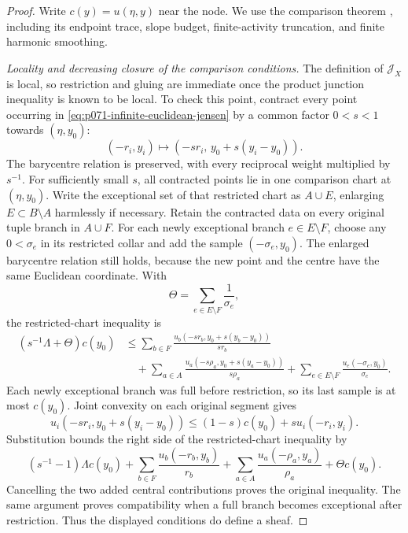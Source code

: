 \begin{proof}
Write $c(y)=u(\eta,y)$ near the node.  We use the comparison theorem
, including its endpoint
trace, slope budget, finite-activity truncation, and finite harmonic
smoothing.

\medskip\noindent
\emph{Locality and decreasing closure of the comparison conditions.}
The definition of $\mathcal J_X$ is local, so restriction and gluing are
immediate once the product junction inequality is known to be local.  To
check this point, contract every point occurring in
\eqref{eq:p071-infinite-euclidean-jensen} by a common factor
$0<s<1$ towards $(\eta,y_0)$:
\[
 (-r_i,y_i)\longmapsto
 (-sr_i,\,y_0+s(y_i-y_0)).
\]
The barycentre relation is preserved, with every reciprocal weight
multiplied by $s^{-1}$.  For sufficiently small $s$, all contracted
points lie in one comparison chart at $(\eta,y_0)$.  Write the exceptional
set of that restricted chart as $A\cup E$, enlarging $E\subset B\setminus
A$ harmlessly if necessary.  Retain the contracted data on every original
tuple branch in $A\cup F$.  For each newly exceptional branch
$e\in E\setminus F$, choose any $0<\sigma_e$ in its restricted collar
and add the sample $(-\sigma_e,y_0)$.  The enlarged barycentre relation
still holds, because the new point and the centre have the same Euclidean
coordinate.  With
\[
                  \Theta=\sum_{e\in E\setminus F}\frac1{\sigma_e},
\]
the restricted-chart inequality is
\begin{align*}
 (s^{-1}\Lambda+\Theta)c(y_0)
 &\leq \sum_{b\in F}
   \frac{u_b(-sr_b,y_0+s(y_b-y_0))}{sr_b}\\
 &\quad+\sum_{a\in A}
   \frac{u_a(-s\rho_a,y_0+s(y_a-y_0))}{s\rho_a}
   +\sum_{e\in E\setminus F}
   \frac{u_e(-\sigma_e,y_0)}{\sigma_e}.
\end{align*}
Each newly exceptional branch was full before restriction, so its last
sample is at most $c(y_0)$.  Joint convexity on each original segment gives
\[
 u_i(-sr_i,y_0+s(y_i-y_0))
 \leq (1-s)c(y_0)+s u_i(-r_i,y_i).
\]
Substitution bounds the right side of the restricted-chart inequality by
\[
 (s^{-1}-1)\Lambda c(y_0)
 +\sum_{b\in F}\frac{u_b(-r_b,y_b)}{r_b}
 +\sum_{a\in A}\frac{u_a(-\rho_a,y_a)}{\rho_a}
 +\Theta c(y_0).
\]
Cancelling the two added central contributions proves the original
inequality.  The same argument proves compatibility when a full branch
becomes exceptional after restriction.  Thus the displayed conditions do
define a sheaf.


\end{proof}
